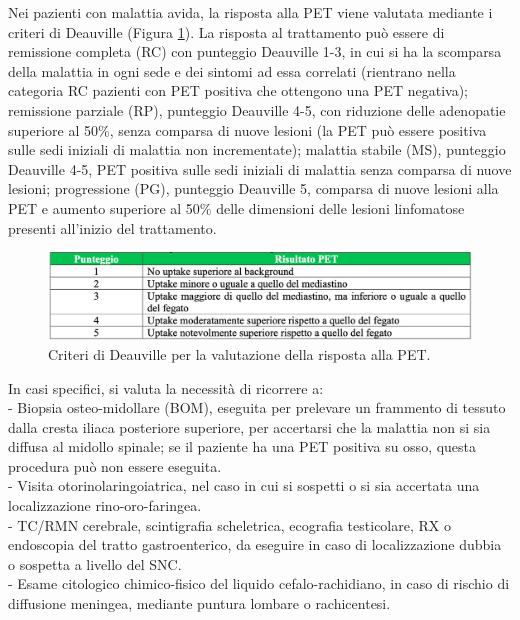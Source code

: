 Nei pazienti con malattia avida, la risposta alla PET viene valutata mediante i criteri di Deauville\cite{AIOM} 
(Figura \ref{fig:FIGURE_2.19}). 
La risposta al trattamento può essere di remissione completa (RC) con punteggio Deauville 1-3, in cui si ha 
la scomparsa della malattia in ogni sede e dei sintomi ad essa correlati (rientrano nella categoria RC pazienti 
con PET positiva che ottengono una PET negativa); remissione parziale (RP), punteggio Deauville 4-5, con riduzione 
delle adenopatie superiore al 50\%, senza comparsa di nuove lesioni (la PET può essere positiva sulle sedi iniziali 
di malattia non incrementate); malattia stabile (MS), punteggio Deauville 4-5, PET positiva sulle sedi iniziali di 
malattia senza comparsa di nuove lesioni; progressione (PG), punteggio Deauville 5, comparsa di nuove lesioni 
alla PET e aumento superiore al 50\% delle dimensioni delle lesioni linfomatose presenti all’inizio del trattamento\cite{AIOM}.\\

\begin{figure}[H]
    \begin{center}
    \includegraphics[width=0.9\columnwidth]{img/DEAUVILLE.png}
    \vspace{-3mm}
    \end{center}
    \caption{Criteri di Deauville per la valutazione della risposta alla PET.
    \cite{AIOM}}
    \label{fig:FIGURE_2.19}
\end{figure}


In casi specifici, si valuta la necessità di ricorrere a:\\ 
- Biopsia osteo-midollare (BOM), eseguita per prelevare un frammento di tessuto dalla cresta iliaca posteriore 
superiore, per accertarsi che la malattia non si sia diffusa al midollo spinale; se il paziente ha una PET positiva 
su osso, questa procedura può non essere eseguita.\\
- Visita otorinolaringoiatrica, nel caso in cui si sospetti o si sia accertata una localizzazione rino-oro-faringea.\\
- TC/RMN cerebrale, scintigrafia scheletrica, ecografia testicolare, RX o endoscopia del tratto gastroenterico, 
da eseguire in caso di localizzazione dubbia o sospetta a livello del SNC.\\
- Esame citologico chimico-fisico del liquido cefalo-rachidiano, in caso di rischio di diffusione meningea, 
mediante puntura lombare o rachicentesi\cite{AIOM}.\\






